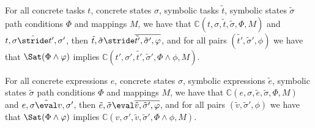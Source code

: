 \begin{lemma}
  \label{lem:completeStride}
  For all concrete tasks $t$, concrete states $\sigma$, symbolic tasks $\tilde{t}$, symbolic states $\tilde{\sigma}$ path conditions $\Phi$ and mappings $M$,
  we have that $\mathds{C}(t,\sigma,\tilde{t},\tilde{\sigma},\Phi,M)$
  and $t,\sigma\hat{\stride} t',\sigma'$,
  then $\tilde{t},\tilde{\sigma}\stride\overline{\tilde{t'},\tilde{\sigma}',\phi}$,
  and for all pairs $(\tilde{t'},\tilde{\sigma}',\phi)$ we have that $\Sat(\Phi\land\phi)$ implies $\mathds{C}(t',\sigma',\tilde{t'},\tilde{\sigma}',\Phi\land\phi,M)$.
\end{lemma}

\begin{lemma}
  \label{lem:completeEval}
  For all concrete expressions $e$, concrete states $\sigma$, symbolic expressions $\tilde{e}$, symbolic states $\tilde{\sigma}$ path conditions $\Phi$ and mappings $M$,
  we have that $\mathds{C}(e,\sigma,\tilde{e},\tilde{\sigma},\Phi,M)$
  and $e,\sigma\hat{\eval} v,\sigma'$,
  then $\tilde{e},\tilde{\sigma}\eval\overline{\tilde{v},\tilde{\sigma}',\phi}$,
  and for all pairs $(\tilde{v},\tilde{\sigma}',\phi)$ we have that $\Sat(\Phi\land\phi)$ implies $\mathds{C}(v,\sigma',\tilde{v},\tilde{\sigma}',\Phi\land\phi,M)$.
\end{lemma}


